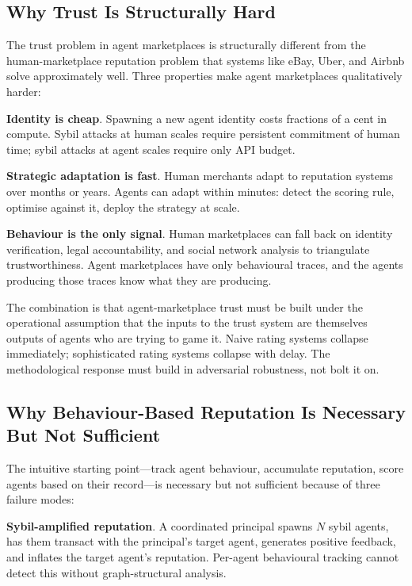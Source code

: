 \documentclass[sigconf,nonacm]{acmart}
\begin{document}
\subsection{Why Trust Is Structurally Hard}

The trust problem in agent marketplaces is structurally different
from the human-marketplace reputation problem that systems like
eBay, Uber, and Airbnb solve approximately well. Three properties
make agent marketplaces qualitatively harder:

\textbf{Identity is cheap}. Spawning a new agent identity costs
fractions of a cent in compute. Sybil attacks at human scales
require persistent commitment of human time; sybil attacks at agent
scales require only API budget.

\textbf{Strategic adaptation is fast}. Human merchants adapt to
reputation systems over months or years. Agents can adapt within
minutes: detect the scoring rule, optimise against it, deploy the
strategy at scale.

\textbf{Behaviour is the only signal}. Human marketplaces can fall
back on identity verification, legal accountability, and social
network analysis to triangulate trustworthiness. Agent marketplaces
have only behavioural traces, and the agents producing those traces
know what they are producing.

The combination is that agent-marketplace trust must be built
under the operational assumption that the inputs to the trust
system are themselves outputs of agents who are trying to game it.
Naive rating systems collapse immediately; sophisticated rating
systems collapse with delay. The methodological response must build
in adversarial robustness, not bolt it on.

\subsection{Why Behaviour-Based Reputation Is Necessary But Not Sufficient}

The intuitive starting point---track agent behaviour, accumulate
reputation, score agents based on their record---is necessary but
not sufficient because of three failure modes:

\textbf{Sybil-amplified reputation}. A coordinated principal spawns
$N$ sybil agents, has them transact with the principal's
target agent, generates positive feedback, and inflates the target
agent's reputation. Per-agent behavioural tracking cannot detect
this without graph-structural analysis.
\end{document}
